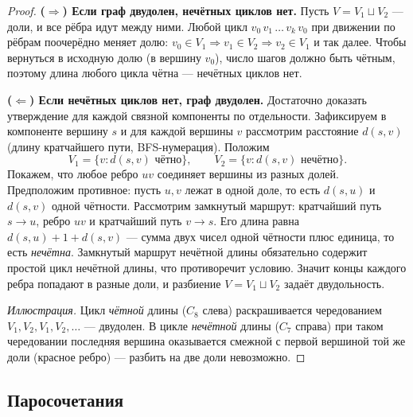 \begin{proof}
\textbf{($\Rightarrow$) Если граф двудолен, нечётных циклов нет.} Пусть
$V=V_1\sqcup V_2$ --- доли, и все рёбра идут между ними. Любой цикл
$v_0\,v_1\,\dots\,v_k\,v_0$ при движении по рёбрам поочерёдно меняет долю:
$v_0\in V_1\Rightarrow v_1\in V_2\Rightarrow v_2\in V_1$ и так далее. Чтобы
вернуться в исходную долю (в вершину $v_0$), число шагов должно быть чётным,
поэтому длина любого цикла чётна --- нечётных циклов нет.

\smallskip
\textbf{($\Leftarrow$) Если нечётных циклов нет, граф двудолен.} Достаточно
доказать утверждение для каждой связной компоненты по отдельности. Зафиксируем
в компоненте вершину $s$ и для каждой вершины $v$ рассмотрим расстояние
$d(s,v)$ (длину кратчайшего пути, BFS-нумерация). Положим
\[
  V_1=\{v\colon d(s,v)\text{ чётно}\},\qquad
  V_2=\{v\colon d(s,v)\text{ нечётно}\}.
\]
Покажем, что любое ребро $uv$ соединяет вершины из разных долей. Предположим
противное: пусть $u,v$ лежат в одной доле, то есть $d(s,u)$ и $d(s,v)$ одной
чётности. Рассмотрим замкнутый маршрут: кратчайший путь $s\to u$, ребро $uv$ и
кратчайший путь $v\to s$. Его длина равна $d(s,u)+1+d(s,v)$ --- сумма двух
чисел одной чётности плюс единица, то есть \emph{нечётна}. Замкнутый маршрут
нечётной длины обязательно содержит простой цикл нечётной длины, что
противоречит условию. Значит концы каждого ребра попадают в разные доли, и
разбиение $V=V_1\sqcup V_2$ задаёт двудольность.

\smallskip
\textit{Иллюстрация.} Цикл \emph{чётной} длины ($C_8$ слева)
раскрашивается чередованием $V_1,V_2,V_1,V_2,\dots$ --- двудолен. В цикле
\emph{нечётной} длины ($C_7$ справа) при таком чередовании последняя
вершина оказывается смежной с первой вершиной той же доли (красное
ребро) --- разбить на две доли невозможно.


\end{proof}


\subsection*{Паросочетания}

